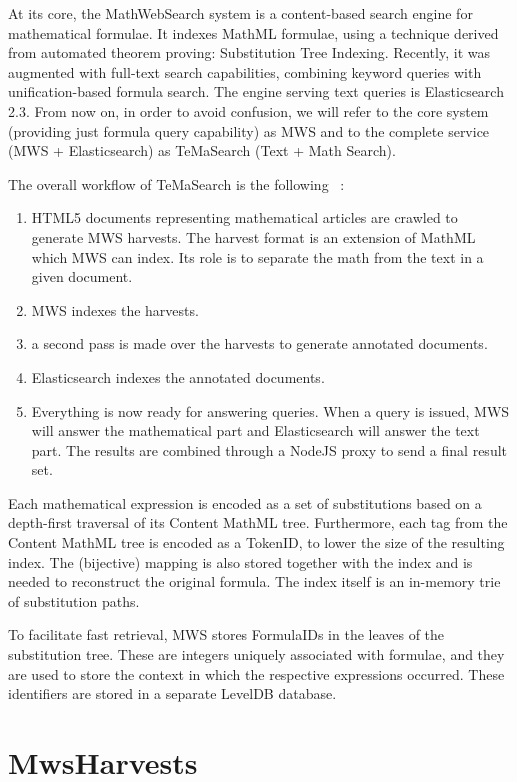 \documentclass{deliverablereport}
\begin{document}
At its core, the MathWebSearch system is a content-based search engine for mathematical
formulae. It indexes MathML formulae, using a technique derived from automated theorem
proving: Substitution Tree Indexing. Recently, it was augmented with full-text search
capabilities, combining keyword queries with unification-based formula search. The engine
serving text queries is Elasticsearch 2.3. From now on, in order to avoid confusion, we
will refer to the core system (providing just formula query capability) as MWS and to the
complete service (MWS + Elasticsearch) as TeMaSearch (Text + Math Search).

The overall workflow of TeMaSearch is the following ~\cite{Ham:bcs15}: 

\begin{enumerate}
\item HTML5 documents representing mathematical articles are crawled to generate MWS
  harvests. The harvest format is an extension of MathML which MWS can index. Its role is
  to separate the math from the text in a given document.
\item MWS indexes the harvests.
\item a second pass is made over the harvests to generate annotated documents.
\item Elasticsearch indexes the annotated documents.
\item Everything is now ready for answering queries. When a query is issued, MWS will
  answer the mathematical part and Elasticsearch will answer the text part. The results
  are combined through a NodeJS proxy to send a final result set.
\end{enumerate}

Each mathematical expression is encoded as a set of substitutions based on a depth-first
traversal of its Content MathML tree. Furthermore, each tag from the Content MathML tree
is encoded as a TokenID, to lower the size of the resulting index. The (bijective) mapping
is also stored together with the index and is needed to reconstruct the original
formula. The index itself is an in-memory trie of substitution paths.

To facilitate fast retrieval, MWS stores FormulaIDs in the leaves of the substitution
tree. These are integers uniquely associated with formulae, and they are used to store the
context in which the respective expressions occurred. These identifiers are stored in a
separate LevelDB database.

\section{MwsHarvests}\label{sec:harvests}
\end{document}

